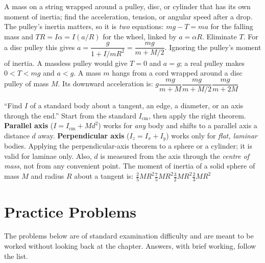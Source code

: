 {A mass on a string wrapped around a pulley, disc, or cylinder that has its own moment of inertia; find
the acceleration, tension, or angular speed after a drop.}
{The pulley's inertia matters, so it is \emph{two} equations: $mg-T=ma$ for the falling mass and
$TR=I\alpha=I(a/R)$ for the wheel, linked by $a=\alpha R$. Eliminate $T$. For a disc pulley this gives
$a=\dfrac{g}{1+I/mR^2}=\dfrac{mg}{m+M/2}$.}
{Ignoring the pulley's moment of inertia. A massless pulley would give $T=0$ and $a=g$; a real pulley makes $0<T<mg$ and $a<g$.}
{A mass $m$ hangs from a cord wrapped around a disc pulley of mass $M$. Its downward acceleration is:}
{$g$}{$\dfrac{mg}{m+M}$}{$\dfrac{mg}{m+M/2}$}{$\dfrac{mg}{m+2M}$}

{``Find $I$ of a standard body about a tangent, an edge, a diameter, or an axis through the end.''}
{Start from the standard $I_{\text{cm}}$, then apply the right theorem. \textbf{Parallel axis}
($I=I_{\text{cm}}+Md^2$) works for \emph{any} body and shifts to a parallel axis a distance $d$ away.
\textbf{Perpendicular axis} ($I_z=I_x+I_y$) works only for \emph{flat, laminar} bodies.}
{Applying the perpendicular-axis theorem to a sphere or a cylinder; it is valid for laminae only.
Also, $d$ is measured from the axis through the \emph{centre of mass}, not from any convenient point.}
{The moment of inertia of a solid sphere of mass $M$ and radius $R$ about a tangent is:}
{$\tfrac{2}{5}MR^2$}{$\tfrac{7}{5}MR^2$}{$\tfrac{3}{2}MR^2$}{$\tfrac{2}{3}MR^2$}

\section{Practice Problems}\label{sec:practice14}

The problems below are of standard examination difficulty and are meant to be worked without looking back at the chapter. Answers, with brief working, follow the list.

